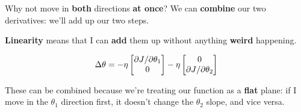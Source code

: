         Why not move in \textbf{both} directions \textbf{at once}? We can \textbf{combine} our two derivatives: we'll add up our two steps.
        
        \textbf{Linearity} means that I can \textbf{add} them up without anything \textbf{weird} happening.
        
        \begin{equation}
            \Delta \theta
            =
            - \eta 
            \begin{bmatrix}
                  {\partial J}/{\partial \theta_1} \\ 0 
            \end{bmatrix}
            - \eta 
            \begin{bmatrix}
                  0 \\ {\partial J}/{\partial \theta_2} 
            \end{bmatrix}
        \end{equation}
        
        These can be combined because we're treating our function as a \textbf{flat} plane: if I move in the $\theta_1$ direction first, it doesn't change the $\theta_2$ slope, and vice versa.
        
